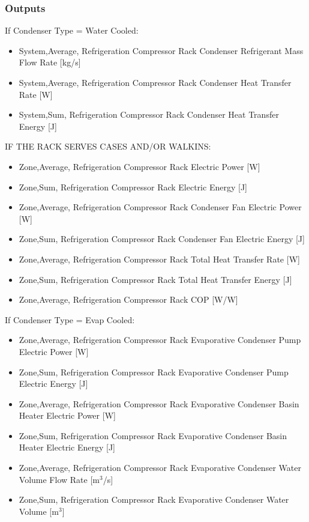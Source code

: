 \subsubsection{Outputs}\label{outputs-028}

If Condenser Type = Water Cooled:

\begin{itemize}
\item
  System,Average, Refrigeration Compressor Rack Condenser Refrigerant Mass Flow Rate {[}kg/s{]}
\item
  System,Average, Refrigeration Compressor Rack Condenser Heat Transfer Rate {[}W{]}
\item
  System,Sum, Refrigeration Compressor Rack Condenser Heat Transfer Energy {[}J{]}
\end{itemize}

IF THE RACK SERVES CASES AND/OR WALKINS:

\begin{itemize}
\item
  Zone,Average, Refrigeration Compressor Rack Electric Power {[}W{]}
\item
  Zone,Sum, Refrigeration Compressor Rack Electric Energy {[}J{]}
\item
  Zone,Average, Refrigeration Compressor Rack Condenser Fan Electric Power {[}W{]}
\item
  Zone,Sum, Refrigeration Compressor Rack Condenser Fan Electric Energy {[}J{]}
\item
  Zone,Average, Refrigeration Compressor Rack Total Heat Transfer Rate {[}W{]}
\item
  Zone,Sum, Refrigeration Compressor Rack Total Heat Transfer Energy {[}J{]}
\item
  Zone,Average, Refrigeration Compressor Rack COP {[}W/W{]}
\end{itemize}

If Condenser Type = Evap Cooled:

\begin{itemize}
\item
  Zone,Average, Refrigeration Compressor Rack Evaporative Condenser Pump Electric Power {[}W{]}
\item
  Zone,Sum, Refrigeration Compressor Rack Evaporative Condenser Pump Electric Energy {[}J{]}
\item
  Zone,Average, Refrigeration Compressor Rack Evaporative Condenser Basin Heater Electric Power {[}W{]}
\item
  Zone,Sum, Refrigeration Compressor Rack Evaporative Condenser Basin Heater Electric Energy {[}J{]}
\item
  Zone,Average, Refrigeration Compressor Rack Evaporative Condenser Water Volume Flow Rate {[}m\(^{3}\)/s{]}
\item
  Zone,Sum, Refrigeration Compressor Rack Evaporative Condenser Water Volume {[}m\(^{3}\){]}
\end{itemize}

